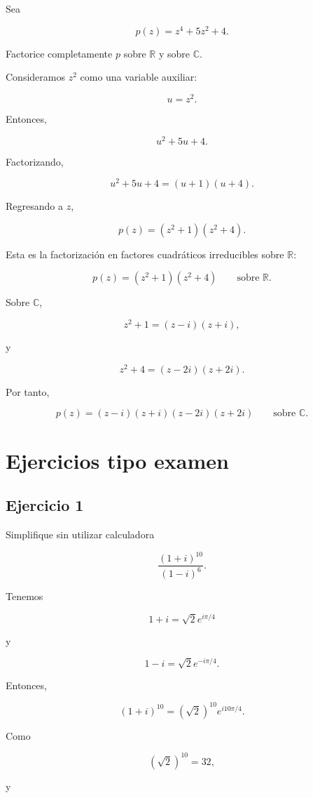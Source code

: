 \documentclass[12pt]{article}
\begin{document}
Sea

\[
p(z)=z^4+5z^2+4.
\]

Factorice completamente \(p\) sobre \(\mathbb R\) y sobre \(\mathbb C\).

Consideramos \(z^2\) como una variable auxiliar:

\[
u=z^2.
\]

Entonces,

\[
u^2+5u+4.
\]

Factorizando,

\[
u^2+5u+4
=
(u+1)(u+4).
\]

Regresando a \(z\),

\[
p(z)
=
(z^2+1)(z^2+4).
\]

Esta es la factorización en factores cuadráticos irreducibles sobre
\(\mathbb R\):

\[
\boxed{
p(z)
=
(z^2+1)(z^2+4)
\qquad\text{sobre }\mathbb R
}.
\]

Sobre \(\mathbb C\),

\[
z^2+1=(z-i)(z+i),
\]

y

\[
z^2+4=(z-2i)(z+2i).
\]

Por tanto,

\[
\boxed{
p(z)
=
(z-i)(z+i)(z-2i)(z+2i)
\qquad\text{sobre }\mathbb C
}.
\]

\section*{Ejercicios tipo examen}

\subsection*{Ejercicio 1}

Simplifique sin utilizar calculadora

\[
\frac{(1+i)^{10}}{(1-i)^6}.
\]

Tenemos

\[
1+i
=
\sqrt2e^{i\pi/4}
\]

y

\[
1-i
=
\sqrt2e^{-i\pi/4}.
\]

Entonces,

\[
(1+i)^{10}
=
(\sqrt2)^{10}
e^{i10\pi/4}.
\]

Como

\[
(\sqrt2)^{10}=32,
\]

y
\end{document}
